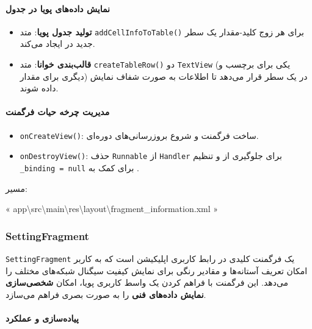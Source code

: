 \documentclass{report}
\begin{document}
\paragraph{نمایش داده‌های پویا در جدول}

\begin{itemize}
	\item \textbf{تولید جدول پویا}: متد \texttt{addCellInfoToTable()} برای هر زوج کلید-مقدار یک سطر جدید در  ایجاد می‌کند.
	\item \textbf{قالب‌بندی خوانا}: متد \texttt{createTableRow()} دو \texttt{TextView} (یکی برای برچسب و دیگری برای مقدار) در یک سطر قرار می‌دهد تا اطلاعات به صورت شفاف نمایش داده شوند.
\end{itemize}

\paragraph{مدیریت چرخه حیات فرگمنت}

\begin{itemize}
	\item \texttt{onCreateView()}: ساخت  فرگمنت و شروع بروزرسانی‌های دوره‌ای.
	\item \texttt{onDestroyView()}: حذف \texttt{Runnable} از \texttt{Handler} برای جلوگیری از  و تنظیم \texttt{\_binding = null} برای کمک به .
\end{itemize}
\begin{note}{مسیر:}
	\begin{latin}
		« app\textbackslash src\textbackslash main\textbackslash res\textbackslash layout\textbackslash fragment\_information.xml »
	\end{latin}
\end{note}

\subsubsection{SettingFragment}
\texttt{SettingFragment} یک فرگمنت کلیدی در رابط کاربری اپلیکیشن است که به کاربر امکان تعریف آستانه‌ها و مقادیر رنگی برای نمایش کیفیت سیگنال شبکه‌های مختلف را می‌دهد. 
این فرگمنت با فراهم کردن یک واسط کاربری پویا، امکان \textbf{شخصی‌سازی نمایش داده‌های فنی} را به صورت بصری فراهم می‌سازد.

\paragraph{پیاده‌سازی و عملکرد}
\end{document}
